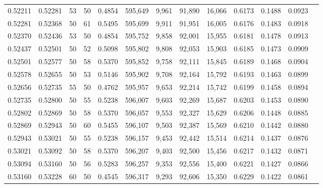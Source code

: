 \begin{tabular}{rrrrrrrrrrrrr}
0.52211 & 0.52281 &    53 &  50 &                                     0.4854 & 595,649 &   9,961 &  91,890 &  16,066 & 0.6173 & 0.1488 & 0.0923 \\
0.52281 & 0.52368 &    50 &  61 &                                     0.5495 & 595,699 &   9,911 &  91,951 &  16,005 & 0.6176 & 0.1483 & 0.0918 \\
0.52370 & 0.52436 &    53 &  50 &                                     0.4854 & 595,752 &   9,858 &  92,001 &  15,955 & 0.6181 & 0.1478 & 0.0913 \\
0.52437 & 0.52501 &    50 &  52 &                                     0.5098 & 595,802 &   9,808 &  92,053 &  15,903 & 0.6185 & 0.1473 & 0.0909 \\
0.52501 & 0.52577 &    50 &  58 &                                     0.5370 & 595,852 &   9,758 &  92,111 &  15,845 & 0.6189 & 0.1468 & 0.0904 \\
0.52578 & 0.52655 &    50 &  53 &                                     0.5146 & 595,902 &   9,708 &  92,164 &  15,792 & 0.6193 & 0.1463 & 0.0899 \\
0.52656 & 0.52735 &    55 &  50 &                                     0.4762 & 595,957 &   9,653 &  92,214 &  15,742 & 0.6199 & 0.1458 & 0.0894 \\
0.52735 & 0.52800 &    50 &  55 &                                     0.5238 & 596,007 &   9,603 &  92,269 &  15,687 & 0.6203 & 0.1453 & 0.0890 \\
0.52802 & 0.52869 &    50 &  58 &                                     0.5370 & 596,057 &   9,553 &  92,327 &  15,629 & 0.6206 & 0.1448 & 0.0885 \\
0.52869 & 0.52943 &    50 &  60 &                                     0.5455 & 596,107 &   9,503 &  92,387 &  15,569 & 0.6210 & 0.1442 & 0.0880 \\
0.52943 & 0.53021 &    50 &  55 &                                     0.5238 & 596,157 &   9,453 &  92,442 &  15,514 & 0.6214 & 0.1437 & 0.0876 \\
0.53021 & 0.53092 &    50 &  58 &                                     0.5370 & 596,207 &   9,403 &  92,500 &  15,456 & 0.6217 & 0.1432 & 0.0871 \\
0.53094 & 0.53160 &    50 &  56 &                                     0.5283 & 596,257 &   9,353 &  92,556 &  15,400 & 0.6221 & 0.1427 & 0.0866 \\
0.53160 & 0.53228 &    60 &  50 &                                     0.4545 & 596,317 &   9,293 &  92,606 &  15,350 & 0.6229 & 0.1422 & 0.0861 \\

\end{tabular}
